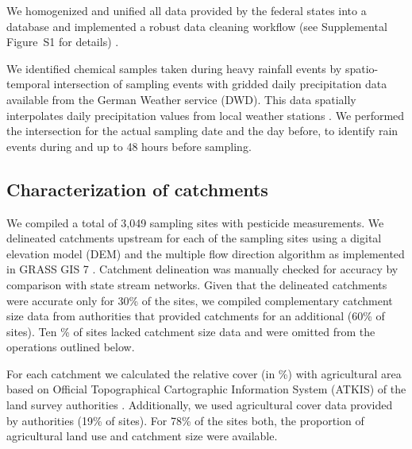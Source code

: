 \documentclass[journal=esthag,manuscript=article]{achemso}
\begin{document}
We homogenized and unified all data provided by the federal states into a database and implemented a robust data cleaning workflow (see Supplemental Figure~S1 for details) \citep{poisot_best_2015}.

We identified chemical samples taken during heavy rainfall events by spatio-temporal intersection of sampling events with gridded daily precipitation data available from the German Weather service (DWD).
This data spatially interpolates daily precipitation values from local weather stations \citep{rauthe_central_2013}. 
We performed the intersection for the actual sampling date and the day before, to identify rain events during and up to 48 hours before sampling.

\subsection{Characterization of catchments}
We compiled a total of 3,049 sampling sites with pesticide measurements.
We delineated catchments upstream for each of the sampling sites using a digital elevation model (DEM) \citep{eea_digital_2013} and the multiple flow direction algorithm \citep{holmgren_multiple_1994} as implemented in GRASS GIS 7 \citep{neteler_grass_2012}.
Catchment delineation was manually checked for accuracy by comparison with state stream networks.
Given that the delineated catchments were accurate only for 30\% of the sites,
we compiled complementary catchment size data from authorities that provided catchments for an additional (60\% of sites). Ten \% of sites lacked catchment size data and were omitted from the operations outlined below.

For each catchment we calculated the relative cover (in \%) with agricultural area based on Official Topographical Cartographic Information System (ATKIS) of the land survey authorities \citep{adv_atkis_2016}.
Additionally, we used agricultural cover data provided by authorities (19\% of sites). 
For 78\% of the sites both, the proportion of agricultural land use and catchment size were available.
\end{document}
